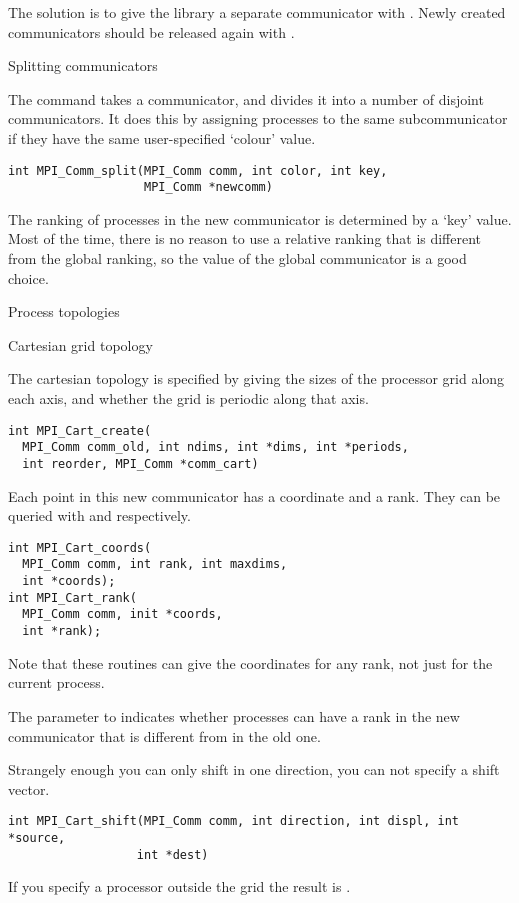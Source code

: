 The solution is to give the library a separate communicator with
. Newly created communicators should be
released again with .


 {Splitting communicators}

The command  takes a communicator, and
divides it into a number of disjoint communicators. It does this by
assigning processes to the same subcommunicator if they have the same
user-specified `colour' value.
\begin{verbatim}
int MPI_Comm_split(MPI_Comm comm, int color, int key, 
                   MPI_Comm *newcomm)
\end{verbatim}
The ranking of processes in the new communicator is determined by a `key' value.
Most of the time, there is no reason to use a relative ranking that is different from
the global ranking, so the  value of the global communicator
is a good choice.

 {Process topologies}

 {Cartesian grid topology}

The cartesian topology is specified by giving
 the sizes of the processor grid along
each axis, and whether the grid is periodic along that axis.
\begin{verbatim}
int MPI_Cart_create(
  MPI_Comm comm_old, int ndims, int *dims, int *periods, 
  int reorder, MPI_Comm *comm_cart)
\end{verbatim}
Each point in this new communicator has a coordinate and a rank.  They
can be queried with  and
 respectively.
\begin{verbatim}
int MPI_Cart_coords(
  MPI_Comm comm, int rank, int maxdims,
  int *coords);
int MPI_Cart_rank(
  MPI_Comm comm, init *coords, 
  int *rank);
\end{verbatim}
Note that these routines can give the coordinates for any rank,
not just for the current process.
%

The  parameter to 
indicates whether processes can have a rank
in the new communicator that is different from in the old one.

Strangely enough you can only shift in one direction, you can not
specify a shift vector.
\begin{verbatim}
int MPI_Cart_shift(MPI_Comm comm, int direction, int displ, int *source, 
                  int *dest)
\end{verbatim}
If you specify a processor outside the grid
the result is .

